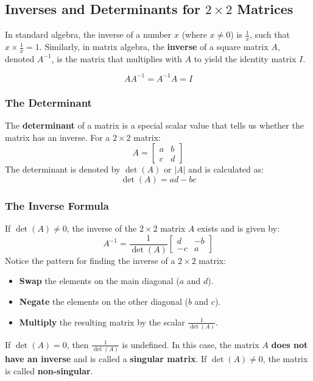 
\subsection{Inverses and Determinants for $2 \times 2$ Matrices}

In standard algebra, the inverse of a number $x$ (where $x \neq 0$) is $\frac{1}{x}$, such that $x \times \frac{1}{x} = 1$. Similarly, in matrix algebra, the \textbf{inverse} of a square matrix $A$, denoted $A^{-1}$, is the matrix that multiplies with $A$ to yield the identity matrix $I$.

\[
A A^{-1} = A^{-1} A = I
\]

\subsubsection*{The Determinant}

The \textbf{determinant} of a matrix is a special scalar value that tells us whether the matrix has an inverse. For a $2 \times 2$ matrix:
\[
A = \begin{bmatrix} a & b \\ c & d \end{bmatrix}
\]
The determinant is denoted by $\det(A)$ or $|A|$ and is calculated as:
\[
\det(A) = ad - bc
\]

\subsubsection*{The Inverse Formula}

If $\det(A) \neq 0$, the inverse of the $2 \times 2$ matrix $A$ exists and is given by:
\[
A^{-1} = \frac{1}{\det(A)} \begin{bmatrix} d & -b \\ -c & a \end{bmatrix}
\]
Notice the pattern for finding the inverse of a $2 \times 2$ matrix:
\begin{itemize}[leftmargin=*]
  \item \textbf{Swap} the elements on the main diagonal ($a$ and $d$).
  \item \textbf{Negate} the elements on the other diagonal ($b$ and $c$).
  \item \textbf{Multiply} the resulting matrix by the scalar $\frac{1}{\det(A)}$.
\end{itemize}

\begin{remark}
If $\det(A) = 0$, then $\frac{1}{\det(A)}$ is undefined. In this case, the matrix $A$ \textbf{does not have an inverse} and is called a \textbf{singular matrix}. If $\det(A) \neq 0$, the matrix is called \textbf{non-singular}.
\end{remark}

